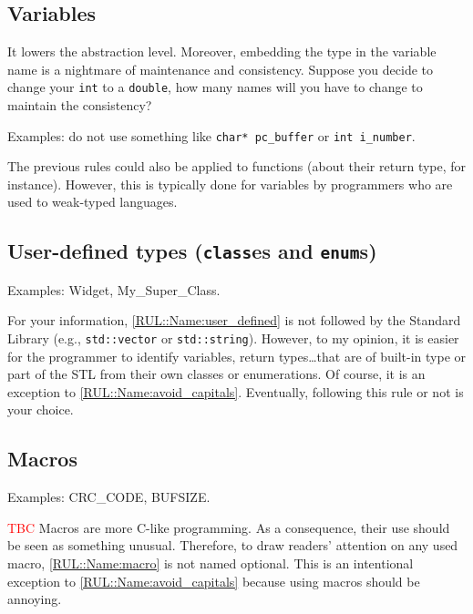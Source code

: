 	\subsection{Variables}
	
		\begin{guiderule}
			It lowers the abstraction level.
			Moreover, embedding the type in the variable name is a nightmare of maintenance and consistency.
			Suppose you decide to change your \verb|int| to a \verb|double|, how many names will you have to change to maintain the consistency? \cite{Martin_2009__Coder_propr,Stroustrup_2013__Cpp_Prog_Lang}
			
			Examples: do not use something like \verb|char* pc_buffer| or \verb|int i_number|.
		\end{guiderule}
	
		The previous rules could also be applied to functions (about their return type, for instance).
		However, this is typically done for variables by programmers who are used to weak-typed languages.


	\subsection{User-defined types (\texttt{class}es and \texttt{enum}s)}
	
		\begin{optionalrule}
			\label{RUL::Name:user_defined}
			Examples: Widget, My\_Super\_Class.
		\end{optionalrule}
	
		For your information, \cref{RUL::Name:user_defined} is not followed by the Standard Library (e.g., \verb|std::vector| or \verb|std::string|).
		However, to my opinion, it is easier for the programmer to identify variables, return types\dots that are of built-in type or part of the STL from their own classes or enumerations.
		Of course, it is an exception to \cref{RUL::Name:avoid_capitals}.
		Eventually, following this rule or not is your choice.
	
	
	\subsection{Macros}
	
		\begin{guiderule}
			\label{RUL::Name:macro}
			Examples: CRC\_CODE, BUFSIZE.
		\end{guiderule}
	
		\textcolor{red}{TBC}
		Macros are more C-like programming.
		As a consequence, their use should be seen as something unusual.
		Therefore, to draw readers' attention on any used macro, \cref{RUL::Name:macro} is not named optional.
		This is an intentional exception to \cref{RUL::Name:avoid_capitals} because using macros should be annoying.

